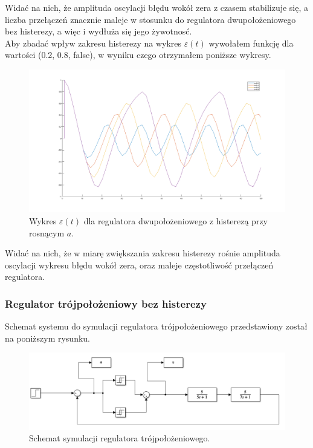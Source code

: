 \documentclass[a4paper,10pt]{article}
\begin{document}
Widać na nich, że amplituda oscylacji błędu wokół zera z czasem stabilizuje się, a liczba przełączeń znacznie maleje w stosunku do regulatora dwupołożeniowego bez histerezy, a więc i wydłuża się jego żywotnosć. \\
Aby zbadać wpływ zakresu histerezy na wykres $\varepsilon(t)$ wywołałem funkcję dla wartości (0.2, 0.8, false), w wyniku czego otrzymałem poniższe wykresy.

\begin{figure}[!h]
    \centering
	\includegraphics[width=120mm]{dwu_z_his_e_2.png}
	\caption{Wykres $\varepsilon(t)$ dla regulatora dwupołożeniowego z histerezą przy rosnącym $a$.}
    \label{fig:Rysunek}
\end{figure}

\newpage Widać na nich, że w miarę zwiększania zakresu histerezy rośnie amplituda oscylacji wykresu błędu wokół zera, oraz maleje częstotliwość przełączeń regulatora.

\subsubsection{Regulator trójpołożeniowy bez histerezy}\label{sec:r3bh}

\normalsize Schemat systemu do symulacji regulatora trójpołożeniowego przedstawiony został na poniższym rysunku.

\begin{figure}[!h]
    \centering
	\includegraphics[width=120mm]{troj_schemat.png}
	\caption{Schemat symulacji regulatora trójpołożeniowego.}
    \label{fig:Rysunek}
\end{figure}
\end{document}
